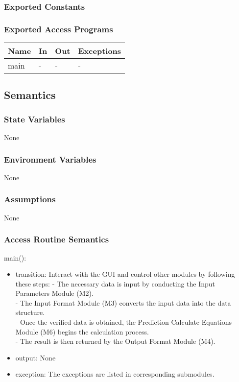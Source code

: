 \documentclass[12pt, titlepage]{article}
\begin{document}
\subsubsection{Exported Constants}

\subsubsection{Exported Access Programs}

\begin{center}
\begin{tabular}{p{2cm} p{4cm} p{4cm} p{2cm}}
\hline
\textbf{Name} & \textbf{In} & \textbf{Out} & \textbf{Exceptions} \\
\hline
main & - & - & - \\
\hline
\end{tabular}
\end{center}

\subsection{Semantics}

\subsubsection{State Variables}

None

\subsubsection{Environment Variables}

None

\subsubsection{Assumptions}

None

\subsubsection{Access Routine Semantics}

main():
\begin{itemize}
\item transition: Interact with the GUI and control other modules by following these steps:
    - The necessary data is input by conducting the Input Parameters Module (M2).\\
    - The Input Format Module (M3) converts the input data into the data structure.\\
    - Once the verified data is obtained, the Prediction Calculate Equations Module (M6) begins the calculation process.\\
    - The result is then returned by the Output Format Module (M4).\\
\item output: None
\item exception: The exceptions are listed in corresponding submodules.

\end{itemize}
\end{document}
